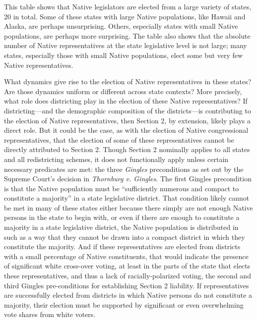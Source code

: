 \documentclass[12pt]{article}
\begin{document}
This table shows that Native legislators are elected from a large variety of states, 20 in total. Some of these states with large Native populations, like Hawaii and Alaska, are perhaps unsurprising. Others, especially states with small Native populations, are perhaps more surprising. The table also shows that the absolute number of Native representatives at the state legislative level is not large; many states, especially those with small Native populations, elect some but very few Native representatives.

What dynamics give rise to the election of Native representatives in these states? Are those dynamics uniform or different across state contexts? More precisely, what role does districting play in the election of these Native representatives? If districting—and the demographic composition of the districts—is contributing to the election of Native representatives, then Section 2, by extension, likely plays a direct role. But it could be the case, as with the election of Native congressional representatives, that the election of some of these representatives cannot be directly attributed to Section 2. Though Section 2 nominally applies to all states and all redistricting schemes, it does not functionally apply unless certain necessary predicates are met: the three \textit{Gingles} preconditions as set out by the Supreme Court's decision in \textit{Thornburg v. Gingles}. The first Gingles precondition is that the Native population must be ``sufficiently numerous and compact to constitute a majority'' in a state legislative district. That condition likely cannot be met in many of these states either because there simply are not enough Native persons in the state to begin with, or even if there are enough to constitute a majority in a state legislative district, the Native population is distributed in such as a way that they cannot be drawn into a compact district in which they constitute the majority. And if these representatives are elected from districts with a small percentage of Native constituents, that would indicate the presence of significant white cross-over voting, at least in the parts of the state that elects these representatives, and thus a lack of racially-polarized voting, the second and third Gingles pre-conditions for establishing Section 2 liability. If representatives are successfully elected from districts in which Native persons do not constitute a majority, their election must be supported by significant or even overwhelming vote shares from white voters.
\end{document}
